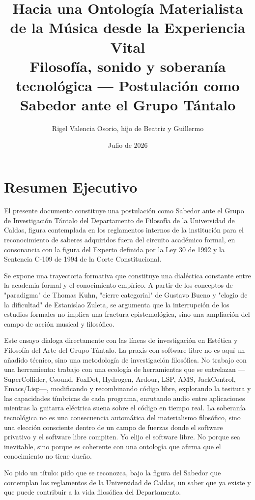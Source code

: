 \documentclass[14pt, a4paper]{article}
\author{Rigel Valencia Osorio, hijo de Beatriz y Guillermo}
\date{Julio de 2026}
\title{Hacia una Ontología Materialista de la Música desde la Experiencia Vital\\\medskip
\large Filosofía, sonido y soberanía tecnológica — Postulación como Sabedor ante el Grupo Tántalo}
\begin{document}
\maketitle
\tableofcontents

\section{Resumen Ejecutivo}
\label{resumen}
El presente documento constituye una postulación como Sabedor ante el
Grupo de Investigación Tántalo del Departamento de Filosofía de la
Universidad de Caldas, figura contemplada en los reglamentos internos
de la institución para el reconocimiento de saberes adquiridos fuera
del circuito académico formal, en consonancia con la figura del
Experto definida por la Ley 30 de 1992 y la Sentencia C-109 de 1994
de la Corte Constitucional.

Se expone una trayectoria formativa que constituye una dialéctica
constante entre la academia formal y el conocimiento empírico. A
partir de los conceptos de "paradigma" de Thomas Kuhn, "cierre
categorial" de Gustavo Bueno y "elogio de la dificultad" de
Estanislao Zuleta, se argumenta que la interrupción de los estudios
formales no implica una fractura epistemológica, sino una ampliación
del campo de acción musical y filosófico.

Este ensayo dialoga directamente con las líneas de investigación en
Estética y Filosofía del Arte del Grupo Tántalo. La praxis con
software libre no es aquí un añadido técnico, sino una metodología de
investigación filosófica. No trabajo con una herramienta: trabajo con
una ecología de herramientas que se entrelazan —SuperCollider, Csound,
FoxDot, Hydrogen, Ardour, LSP, AMS, JackControl, Emacs/Lisp—,
modificando y recombinando código libre, explorando la tesitura y las
capacidades tímbricas de cada programa, enrutando audio entre
aplicaciones mientras la guitarra eléctrica suena sobre el código en
tiempo real. La soberanía tecnológica no es una consecuencia
automática del materialismo filosófico, sino una elección consciente
dentro de un campo de fuerzas donde el software privativo y el
software libre compiten. Yo elijo el software libre. No porque sea
inevitable, sino porque es coherente con una ontología que afirma que
el conocimiento no tiene dueño.

No pido un título: pido que se reconozca, bajo la figura del Sabedor
que contemplan los reglamentos de la Universidad de Caldas, un saber
que ya existe y que puede contribuir a la vida filosófica del
Departamento.
\end{document}

